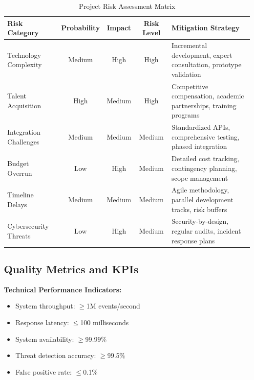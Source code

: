\documentclass[12pt,a4paper]{article}
\begin{document}
\begin{table}[H]
\centering
\caption{Project Risk Assessment Matrix}
\begin{tabular}{|p{4cm}|c|c|c|p{5cm}|}
\hline
\rowcolor{lightblue}
\textbf{Risk Category} & \textbf{Probability} & \textbf{Impact} & \textbf{Risk Level} & \textbf{Mitigation Strategy} \\
\hline

Technology Complexity & Medium & High & High & 
Incremental development, expert consultation, prototype validation \\
\hline

Talent Acquisition & High & Medium & High & 
Competitive compensation, academic partnerships, training programs \\
\hline

Integration Challenges & Medium & Medium & Medium & 
Standardized APIs, comprehensive testing, phased integration \\
\hline

Budget Overrun & Low & High & Medium & 
Detailed cost tracking, contingency planning, scope management \\
\hline

Timeline Delays & Medium & Medium & Medium & 
Agile methodology, parallel development tracks, risk buffers \\
\hline

Cybersecurity Threats & Low & High & Medium & 
Security-by-design, regular audits, incident response plans \\
\hline

\end{tabular}
\end{table}

\subsection{Quality Metrics and KPIs}

\textbf{Technical Performance Indicators:}
\begin{itemize}
    \item System throughput: $\geq$1M events/second
    \item Response latency: $\leq$100 milliseconds
    \item System availability: $\geq$99.99\%
    \item Threat detection accuracy: $\geq$99.5\%
    \item False positive rate: $\leq$0.1\%
\end{itemize}
\end{document}
